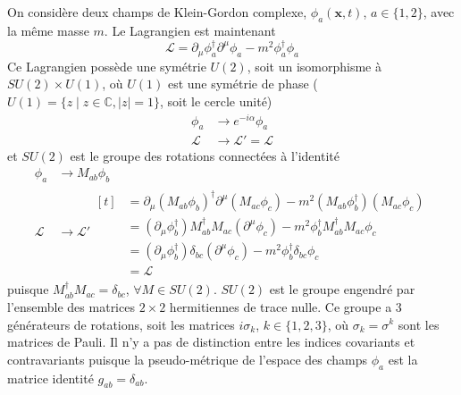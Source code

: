 \documentclass{article}
\numberwithin{equation}{section}
\begin{document}
\subsection{}
On considère deux champs de Klein-Gordon complexe, $\phi_a(\mathbf{x}, t)$, $a \in \{1, 2\}$, avec la même masse $m$.
Le Lagrangien est maintenant
\begin{equation}
        \mathcal{L} = \partial_{\mu} \phi_a^{\dagger} \partial^{\mu}\phi_a - m^{2} \phi_a^{\dagger}\phi_a
\end{equation} 
Ce Lagrangien possède une symétrie $U(2)$, soit un isomorphisme à $SU(2) \times U(1)$, où $U(1)$ est une symétrie de 
phase ($U(1) = \{z \mid z \in \mathbb{C}, |z| = 1\}$, soit le cercle unité)
\begin{align*}
        \phi_a &\rightarrow e^{-i \alpha} \phi_a \\
        \mathcal{L} &\rightarrow \mathcal{L}' = \mathcal{L}
\end{align*}
et $SU(2)$ est le groupe des rotations connectées à l'identité 
\begin{align}
        \label{eq:rotation}
        \phi_a &\rightarrow M_{ab} \phi_b \\
        \nonumber
        \mathcal{L} &\rightarrow \mathcal{L}'
\begin{aligned}[t]
        &= \partial_{\mu} (M_{ab}\phi_b)^{\dagger} \partial^{\mu}(M_{ac}\phi_c) - m^{2} (M_{ab}\phi_b^{\dagger})(M_{ac}\phi_c)  \\
        &= (\partial_{\mu} \phi_b^{\dagger}) M_{ab}^{\dagger} M_{ac}(\partial^{\mu}\phi_c) - m^{2} \phi_b^{\dagger}M_{ab}^{\dagger}M_{ac}\phi_c  \\
        &= (\partial_{\mu} \phi_b^{\dagger})\delta_{bc} (\partial^\mu\phi_c) - m^{2} \phi_b^{\dagger}\delta_{bc}\phi_c  \\
        &=  \mathcal{L}
\end{aligned}
\end{align}
puisque $M_{ab}^{\dagger}M_{ac} = \delta_{bc}$, $\forall M \in SU(2)$. 
$SU(2)$ est le groupe engendré par l'ensemble des matrices $2\times 2$ hermitiennes de trace nulle. 
Ce groupe a 3 générateurs de rotations, soit les matrices $i\sigma_k$, $k \in \{1, 2, 3\}$, où $\sigma_k = \sigma^{k}$ sont les matrices de Pauli. Il n'y a pas 
de distinction entre les indices covariants et contravariants puisque la pseudo-métrique de l'espace des champs $\phi_a$ est la matrice identité $g_{a b} = \delta_{a b}$.
\end{document}
